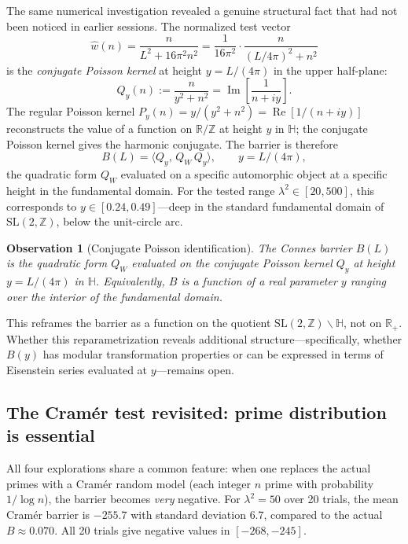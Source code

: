 \documentclass[11pt,a4paper]{article}
\newtheorem{observation}{Observation}[section]
\begin{document}
The same numerical investigation revealed a genuine structural fact that had not been noticed in earlier sessions. The normalized test vector
\[
  \hat{w}(n) = \frac{n}{L^2 + 16\pi^2 n^2} = \frac{1}{16\pi^2} \cdot \frac{n}{(L/4\pi)^2 + n^2}
\]
is the \emph{conjugate Poisson kernel} at height $y = L/(4\pi)$ in the upper half-plane:
\[
  Q_y(n) := \frac{n}{y^2 + n^2} = \operatorname{Im}\!\left[\frac{1}{n + iy}\right].
\]
The regular Poisson kernel $P_y(n) = y/(y^2+n^2) = \operatorname{Re}[1/(n+iy)]$ reconstructs the value of a function on $\mathbb{R}/\mathbb{Z}$ at height $y$ in $\mathbb{H}$; the conjugate Poisson kernel gives the harmonic conjugate. The barrier is therefore
\[
  B(L) = \langle Q_y,\, Q_W\, Q_y \rangle, \qquad y = L/(4\pi),
\]
the quadratic form $Q_W$ evaluated on a specific automorphic object at a specific height in the fundamental domain. For the tested range $\lambda^2 \in [20, 500]$, this corresponds to $y \in [0.24, 0.49]$---deep in the standard fundamental domain of $\mathrm{SL}(2,\mathbb{Z})$, below the unit-circle arc.

\begin{observation}[Conjugate Poisson identification]
The Connes barrier $B(L)$ is the quadratic form $Q_W$ evaluated on the conjugate Poisson kernel $Q_y$ at height $y = L/(4\pi)$ in $\mathbb{H}$. Equivalently, $B$ is a function of a real parameter $y$ ranging over the interior of the fundamental domain.
\end{observation}

This reframes the barrier as a function on the quotient $\mathrm{SL}(2,\mathbb{Z}) \backslash \mathbb{H}$, not on $\mathbb{R}_+$. Whether this reparametrization reveals additional structure---specifically, whether $B(y)$ has modular transformation properties or can be expressed in terms of Eisenstein series evaluated at $y$---remains open.

\subsection{The Cram\'er test revisited: prime distribution is essential}

All four explorations share a common feature: when one replaces the actual primes with a Cram\'er random model (each integer $n$ prime with probability $1/\log n$), the barrier becomes \emph{very} negative. For $\lambda^2 = 50$ over 20 trials, the mean Cram\'er barrier is $-255.7$ with standard deviation $6.7$, compared to the actual $B \approx 0.070$. All 20 trials give negative values in $[-268, -245]$.
\end{document}
